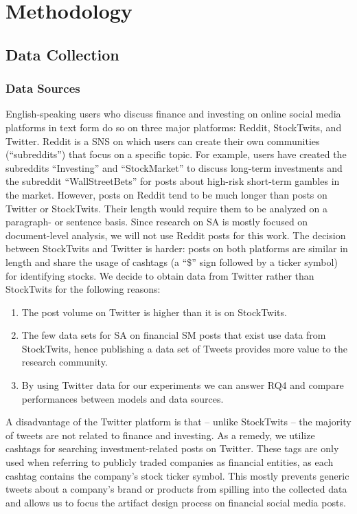 \section{Methodology}
\subsection{Data Collection}
\subsubsection{Data Sources}
English-speaking users who discuss finance and investing on online social media platforms in text form do so on three major platforms: Reddit, StockTwits, and Twitter. Reddit is a SNS on which users can create their own communities (``subreddits'') that focus on a specific topic. For example, users have created the subreddits ``Investing'' and ``StockMarket'' to discuss long-term investments and the subreddit ``WallStreetBets'' for posts about high-risk short-term gambles in the market. However, posts on Reddit tend to be much longer than posts on Twitter or StockTwits. Their length would require them to be analyzed on a paragraph- or sentence basis. Since research on SA is mostly focused on document-level analysis, we will not use Reddit posts for this work. The decision between StockTwits and Twitter is harder: posts on both platforms are similar in length and share the usage of cashtags (a ``\$'' sign followed by a ticker symbol) for identifying stocks. We decide to obtain data from Twitter rather than StockTwits for the following reasons:
\begin{enumerate}[noitemsep]
	\item The post volume on Twitter is higher than it is on StockTwits.
	\item The few data sets for SA on financial SM posts that exist use data from StockTwits, hence publishing a data set of Tweets provides more value to the research community.
	\item By using Twitter data for our experiments we can answer RQ4 and compare performances between models and data sources.
\end{enumerate}

A disadvantage of the Twitter platform is that -- unlike StockTwits -- the majority of tweets are not related to finance and investing. As a remedy, we utilize cashtags for searching investment-related posts on Twitter. These tags are only used when referring to publicly traded companies as financial entities, as each cashtag contains the company's stock ticker symbol. This mostly prevents generic tweets about a company's brand or products from spilling into the collected data and allows us to focus the artifact design process on financial social media posts.

